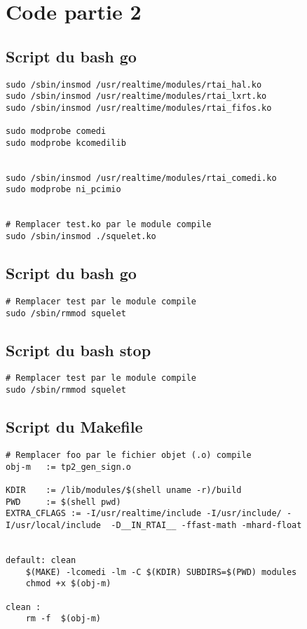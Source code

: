 \section*{Code partie 2}
\subsection*{Script du bash \textbf{go}}

%
\begin{lstlisting}[style = customMakefile]
sudo /sbin/insmod /usr/realtime/modules/rtai_hal.ko
sudo /sbin/insmod /usr/realtime/modules/rtai_lxrt.ko
sudo /sbin/insmod /usr/realtime/modules/rtai_fifos.ko

sudo modprobe comedi
sudo modprobe kcomedilib


sudo /sbin/insmod /usr/realtime/modules/rtai_comedi.ko
sudo modprobe ni_pcimio


# Remplacer test.ko par le module compile
sudo /sbin/insmod ./squelet.ko
\end{lstlisting}

\subsection*{Script du bash \textbf{go}}

%
\begin{lstlisting}[style = customMakefile]
# Remplacer test par le module compile
sudo /sbin/rmmod squelet
\end{lstlisting}
\subsection*{Script du bash \textbf{stop}}
\begin{lstlisting}[style = customMakefile]
# Remplacer test par le module compile
sudo /sbin/rmmod squelet
\end{lstlisting}
\subsection*{Script du \textbf{Makefile}}
\begin{lstlisting}[style = customMakefile]
# Remplacer foo par le fichier objet (.o) compile
obj-m	:= tp2_gen_sign.o

KDIR	:= /lib/modules/$(shell uname -r)/build
PWD		:= $(shell pwd)
EXTRA_CFLAGS := -I/usr/realtime/include -I/usr/include/ -I/usr/local/include  -D__IN_RTAI__ -ffast-math -mhard-float


default: clean
	$(MAKE) -lcomedi -lm -C $(KDIR) SUBDIRS=$(PWD) modules
	chmod +x $(obj-m)
	
clean :
	rm -f  $(obj-m)
\end{lstlisting}
\newpage
